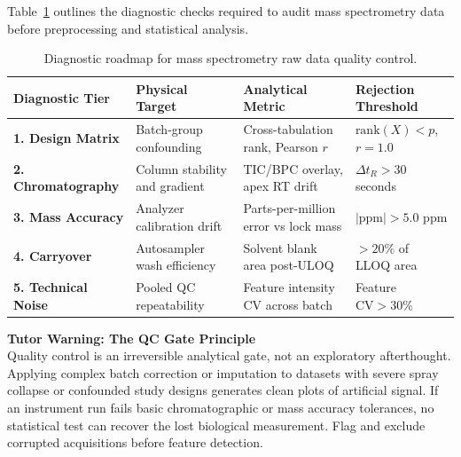\documentclass[11pt,twoside,openright]{book}
\begin{document}
Table~\ref{tab:qc_roadmap} outlines the diagnostic checks required to audit mass spectrometry data before preprocessing and statistical analysis.

\begin{table}[htbp]
\centering
\caption{Diagnostic roadmap for mass spectrometry raw data quality control.}
\label{tab:qc_roadmap}
\small
\begin{tabularx}{\textwidth}{>{\raggedright\arraybackslash}l >{\raggedright\arraybackslash}p{4.2cm} >{\raggedright\arraybackslash}X >{\raggedright\arraybackslash}p{2.8cm}}
\toprule
\textbf{Diagnostic Tier} & \textbf{Physical Target} & \textbf{Analytical Metric} & \textbf{Rejection Threshold} \\
\midrule
\textbf{1. Design Matrix} & Batch-group confounding \cite{leek2010tackling} & Cross-tabulation rank, Pearson $r$ & $\text{rank}(X) < p$, $r = 1.0$ \\
\addlinespace
\textbf{2. Chromatography} & Column stability and gradient & TIC/BPC overlay, apex RT drift \cite{broadhurst2018guidelines} & $\Delta t_R > 30$ seconds \\
\addlinespace
\textbf{3. Mass Accuracy} & Analyzer calibration drift \cite{gross2017mass} & Parts-per-million error vs lock mass & $|\text{ppm}| > 5.0$ ppm \cite{zubarev2007persistent} \\
\addlinespace
\textbf{4. Carryover} & Autosampler wash efficiency \cite{fda2018bioanalytical} & Solvent blank area post-ULOQ & $> 20\%$ of LLOQ area \cite{booth2011workshop} \\
\addlinespace
\textbf{5. Technical Noise} & Pooled QC repeatability \cite{dunn2011procedures} & Feature intensity CV across batch & Feature $\text{CV} > 30\%$ \cite{sangster2006investigation} \\
\bottomrule
\end{tabularx}
\end{table}

\begin{notebox}
\textbf{Tutor Warning: The QC Gate Principle}\\[0.4em]
Quality control is an irreversible analytical gate, not an exploratory afterthought. Applying complex batch correction or imputation to datasets with severe spray collapse or confounded study designs generates clean plots of artificial signal. If an instrument run fails basic chromatographic or mass accuracy tolerances, no statistical test can recover the lost biological measurement. Flag and exclude corrupted acquisitions before feature detection.
\end{notebox}
\end{document}
